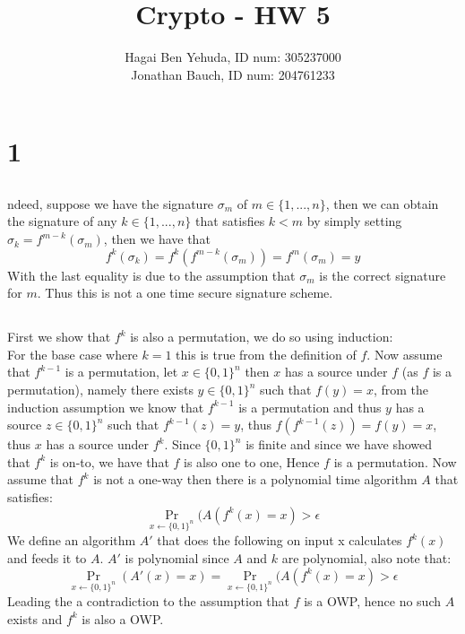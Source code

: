 \documentclass{article}
\title{Crypto - HW 5}
\author{Hagai Ben Yehuda, ID num: 305237000\\ Jonathan Bauch, ID num: 204761233}
\date{}
\begin{document}
  \maketitle

\section{1}
\subsection{}%
ndeed, suppose we have the signature $\sigma_m$ of $m\in\{1,..., n\}$, then we can obtain the signature of any $k \in\{1,...,n\}$ that satisfies $k < m$ by simply setting $\sigma_k = f^{m-k}(\sigma_m)$, then we have that 
\[f^{k}(\sigma_k) = f^{k}(f^{m-k}(\sigma_m)) = f^{m}(\sigma_m) = y\]
With the last equality is due to the assumption that $\sigma_m$ is the correct signature for $m$.
Thus this is not a one time secure signature scheme.

\subsection{}%
First we show that $f^k$ is also a permutation, we do so using induction:\\
For the base case where $k = 1$ this is true from the definition of $f$.
Now assume that $f^{k-1}$ is a permutation, let $x\in\{0,1\}^n$ then $x$ has a source under $f$ (as $f$ is a permutation), namely there exists $y\in\{0,1\}^n$ such that $f(y) = x$, from the induction assumption we know that $f^{k-1}$ is a permutation and thus $y$ has a source $z\in\{0,1\}^n$ such that $f^{k-1}(z) = y$, thus $f(f^{k-1}(z)) = f(y) = x$, thus $x$ has a source under $f^k$.
Since $\{0,1\}^n$ is finite and since we have showed that $f^k$ is on-to, we have that $f$ is also one to one, Hence $f$ is a permutation.
Now assume that $f^k$ is not a one-way then there is a polynomial time algorithm $A$ that satisfies: 
\[\Pr_{x\leftarrow \{0,1\}^n}(A(f^k(x) = x) > \epsilon\]
We define an algorithm $A'$ that does the following on input x calculates $f^k(x)$ and feeds it to $A$. $A'$ is polynomial since $A$ and $k$ are polynomial, also note that:
\[\Pr_{x\leftarrow \{0,1\}^n}(A'(x) = x) = \Pr_{x\leftarrow \{0,1\}^n}(A(f^k(x) = x) > \epsilon\]
Leading the a contradiction to the assumption that $f$ is a OWP, hence no such $A$ exists and $f^k$ is also a OWP.
\end{document}
